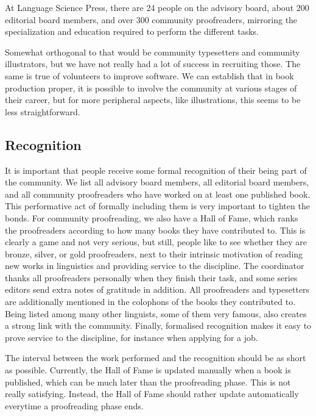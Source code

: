 \documentclass[nonflat,smallfont
]{langsci/langscibook}
\begin{document}
At Language Science Press, there are 24 people on the advisory board, about 200 editorial board members, and over 300 community proofreaders, mirroring the specialization and education required to perform the different tasks. 

Somewhat orthogonal to that would be community typesetters and community illustrators, but we have not really had a lot of success in recruiting those. The same is true of volunteers to improve software. We can establish that in book production proper, it is possible to involve the community at various stages of their career, but for more peripheral aspects, like illustrations, this seems to be less straightforward. 

\subsection{Recognition}
It is important that people receive some formal recognition of their being part of the community. We list all advisory board members, all editorial board members, and all community proofreaders who have worked on at least one published book. This performative act of formally including them is very important to tighten the bonds. For community proofreading, we also have a Hall of Fame, which ranks the proofreaders according to how many books they have contributed to. This is clearly a game and not very serious, but still, people like to see whether they are bronze, silver, or gold proofreaders, next to their intrinsic motivation of reading new works in linguistics and providing service to the discipline. The coordinator thanks all proofreaders personally when they finish their task, and some series editors send extra notes of gratitude in addition. All proofreaders and typesetters are additionally mentioned in the colophons of the books they contributed to. Being listed among many other linguists, some of them very famous, also creates a strong link with the community. Finally, formalised recognition makes it easy to prove service to the discipline, for instance  when applying for a job.

The interval between the work performed and the recognition should be as short as possible. Currently, the Hall of Fame is updated manually when a book is published, which can be much later than the proofreading phase. This is not really satisfying. Instead, the Hall of Fame should rather update automatically everytime a proofreading phase ends.
\end{document}
